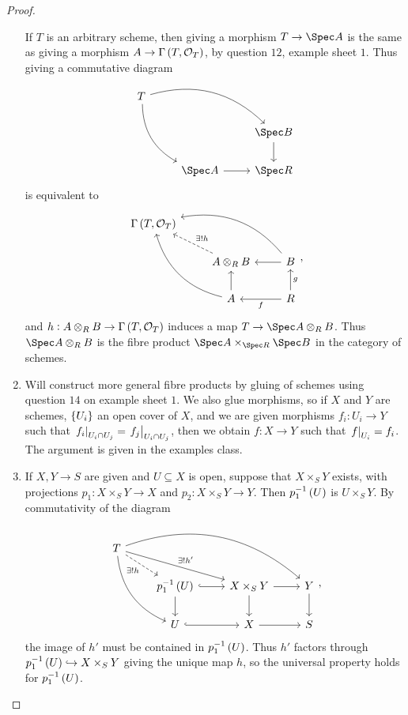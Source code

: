 \begin{proof}
\begin{enumerate}[leftmargin=0.5in, label=Step \arabic*.]
If $ T $ is an arbitrary scheme, then giving a morphism $ T \to \Spec A $ is the same as giving a morphism $ A \to \Gamma\br{T, \OOO_T} $, by question $ 12 $, example sheet $ 1 $. Thus giving a commutative diagram
$$
\begin{tikzcd}
T \arrow[bend left=30]{drr} \arrow[bend right=30]{ddr} & & \\
& & \Spec B \arrow{d} \\
& \Spec A \arrow{r} & \Spec R
\end{tikzcd}
$$
is equivalent to
$$
\begin{tikzcd}
\Gamma\br{T, \OOO_T} & & \\
& A \otimes_R B \arrow[dashed]{ul}[swap]{\exists !h} & B \arrow[bend right=30]{ull} \arrow{l} \\
& A \arrow[bend left=30]{uul} \arrow{u} & R \arrow{u}[swap]{g} \arrow{l}{f}
\end{tikzcd},
$$
and $ h : A \otimes_R B \to \Gamma\br{T, \OOO_T} $ induces a map $ T \to \Spec A \otimes_R B $. Thus $ \Spec A \otimes_R B $ is the fibre product $ \Spec A \times_{\Spec R} \Spec B $ in the category of schemes.
\item Will construct more general fibre products by gluing of schemes using question $ 14 $ on example sheet $ 1 $. We also glue morphisms, so if $ X $ and $ Y $ are schemes, $ \cbr{U_i} $ an open cover of $ X $, and we are given morphisms $ f_i : U_i \to Y $ such that $ \left. f_i \right|_{U_i \cap U_j} = \left. f_j \right|_{U_i \cap U_j} $, then we obtain $ f : X \to Y $ such that $ \left. f \right|_{U_i} = f_i $. The argument is given in the examples class.
\item If $ X, Y \to S $ are given and $ U \subseteq X $ is open, suppose that $ X \times_S Y $ exists, with projections $ p_1 : X \times_S Y \to X $ and $ p_2 : X \times_S Y \to Y $. Then $ p_1^{-1}\br{U} $ is $ U \times_S Y $. By commutativity of the diagram
$$
\begin{tikzcd}
T \arrow[dashed]{dr}[swap]{\exists !h} \arrow{drr}{\exists !h'} \arrow[bend left=30]{drrr} \arrow[bend right=30]{ddr} & & & \\
& p_1^{-1}\br{U} \arrow[hookrightarrow]{r} \arrow{d} & X \times_S Y \arrow{r} \arrow{d} & Y \arrow{d} \\
& U \arrow[hookrightarrow]{r} & X \arrow{r} & S
\end{tikzcd},
$$
the image of $ h' $ must be contained in $ p_1^{-1}\br{U} $. Thus $ h' $ factors through $ p_1^{-1}\br{U} \hookrightarrow X \times_S Y $ giving the unique map $ h $, so the universal property holds for $ p_1^{-1}\br{U} $.

\end{enumerate}
\end{proof}
